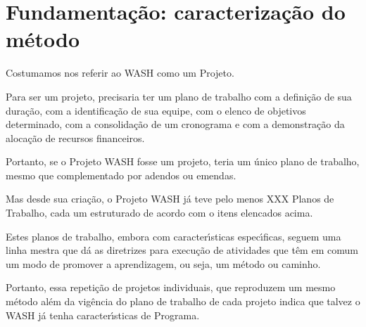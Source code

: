\documentclass[
12pt,		%
openright,	%
twoside,  %
a4paper,			%
chapter=TITLE,		%
english,			%
french,				%
spanish,			%
brazil				%
]{USPSC-classe/USPSC_RedarTex}
\begin{document}
\section[Fundamenta\c{c}\~ao: caracteriza\c{c}\~ao do m\'etodo]{Fundamenta\c{c}\~ao: caracteriza\c{c}\~ao do m\'etodo}\label{Fundamenta\c{c}\~ao: caracteriza\c{c}\~ao do m\'etodo}
Costumamos nos referir ao WASH como um Projeto.










Para ser um projeto, precisaria ter um plano de trabalho com a defini\c{c}\~ao de sua dura\c{c}\~ao, com a identifica\c{c}\~ao de sua equipe, com o elenco de objetivos determinado, com a consolida\c{c}\~ao de um cronograma e com a demonstra\c{c}\~ao da aloca\c{c}\~ao de recursos financeiros.










Portanto, se o Projeto WASH fosse um projeto, teria um \'unico plano de trabalho, mesmo que complementado por adendos ou emendas.










Mas desde sua cria\c{c}\~ao, o Projeto WASH j\'a teve pelo menos XXX Planos de Trabalho, cada um estruturado de acordo com o itens elencados acima.










Estes planos de trabalho, embora com caracter\'{\i}sticas espec\'{\i}ficas, seguem uma linha mestra que d\'a as diretrizes para execu\c{c}\~ao de atividades que t\^em em comum um modo de promover a aprendizagem, ou seja, um m\'etodo ou \textquotedbl caminho\textquotedbl .










Portanto, essa repeti\c{c}\~ao de projetos individuais, que reproduzem um mesmo m\'etodo al\'em da vig\^encia do plano de trabalho de cada projeto indica que talvez o WASH j\'a tenha caracter\'{\i}sticas de Programa.
\end{document}
